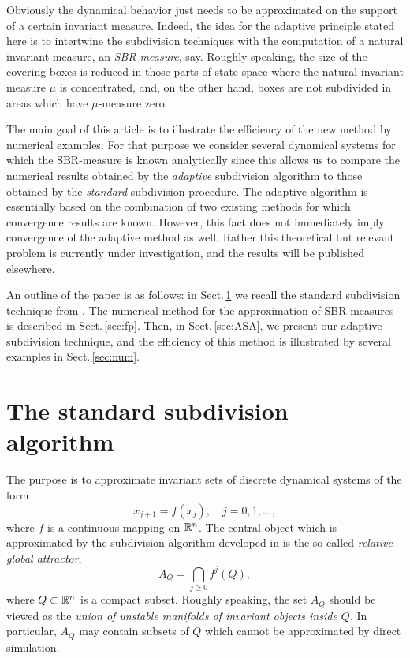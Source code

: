 \documentclass[cvs,envcountsect]{svjour}
\begin{document}
Obviously the dynamical behavior
just needs to be approximated on the support of a certain invariant measure.
Indeed, the idea for the adaptive principle stated here
is to intertwine the subdivision techniques with the computation of a
natural invariant measure, an {\em SBR-measure}, say.  Roughly speaking,
the size of the covering boxes is reduced in those parts of
state space where the natural invariant measure $\mu$ is concentrated, and,
on the other hand, boxes are not subdivided in areas which have
$\mu$-measure zero.

The main goal of this article is to illustrate the efficiency of
the new method by numerical examples.  For that purpose we
consider several dynamical systems
for which the SBR-measure is known analytically since this allows us to
compare the numerical results obtained by the {\em adaptive\/}
subdivision algorithm to those obtained by the {\em standard\/}
subdivision procedure.  The adaptive algorithm is essentially based
on the combination of two existing methods for which
convergence results are known.  However, this fact does not
immediately imply convergence of the adaptive method as well.
Rather this theoretical but relevant problem is
currently under investigation, and the results will be published elsewhere.

An outline of the paper is as follows: in Sect.\,\ref{sec:CSA} we
recall the standard subdivision technique from \cite{DH1}.  The numerical method
for the approximation of SBR-measures is described in Sect.\,\ref{sec:fp}.
Then, in Sect.\,\ref{sec:ASA}, we present our adaptive subdivision technique, and
the efficiency of this method is illustrated by several examples in
Sect.\,\ref{sec:num}.


\section{The standard subdivision algorithm}
\label{sec:CSA}
%
The purpose is to approximate invariant sets of discrete
dynamical systems of the form
\[
x_{j+1} = f(x_j),\quad j=0,1,\ldots,
\]
where $f$ is a continuous mapping on ${\mathbb R}^n$.
The central object which is approximated by the subdivision algorithm
developed in \cite{DH1} is the so-called {\em relative global attractor},
\begin{equation}
\label{eq:relativAttractor2}
A_Q=\bigcap_{j\geq0}f^j(Q),
\end{equation}
where $Q\subset{\mathbb R}^n$ is a compact subset.  Roughly speaking,
the set $A_Q$ should be viewed as the {\em union of unstable
manifolds of invariant objects inside $Q$}.  In particular,
$A_Q$ may contain subsets of $Q$ which cannot be approximated
by direct simulation.
\end{document}
